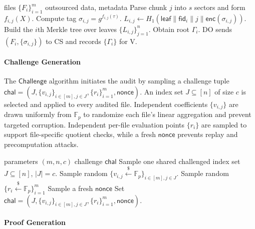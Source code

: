\documentclass[lettersize,journal]{IEEEtran}
\newcommand{\FF}{\mathbb{F}}
\newcommand{\Store}{\mathsf{Store}}
\newcommand{\Chal}{\mathsf{Challenge}}
\begin{document}
\begin{algorithm}[h]
\caption{$\Store$}
\label{alg:store}
\begin{algorithmic}[1]
\Require files $\{F_i\}_{i=1}^m$
\Ensure outsourced data, metadata
    \State Parse chunk $j$ into $s$ sectors and form $f_{i,j}(X)$.
    \State Compute tag $\sigma_{i,j}=g^{f_{i,j}(\tau)}$.
    \State $L_{i,j}\gets H_1(\mathsf{leaf}\|\mathsf{fid}_i\|j\|\mathsf{enc}(\sigma_{i,j}))$.
  \EndFor
  \State Build the $i$th Merkle tree over leaves $\{L_{i,j}\}_{j=1}^n$.
  \State Obtain root $\Gamma_i$.
\EndFor
\State DO sends $(F_i,\{\sigma_{i,j}\})$ to CS and records $\{\Gamma_i\}$ for V.
\end{algorithmic}
\end{algorithm}

\paragraph{\textbf{Challenge Generation}}
The $\Chal$ algorithm initiates the audit by sampling a challenge tuple $\mathsf{chal} = (J, \{v_{i,j}\}_{i\in[m],j\in J}, \{r_i\}_{i=1}^m,\mathsf{nonce})$. An index set $J \subseteq [n]$ of size $c$ is selected and applied to every audited file. Independent coefficients $\{v_{i,j}\}$ are drawn uniformly from $\FF_p$ to randomize each file's linear aggregation and prevent targeted corruption. Independent per-file evaluation points $\{r_i\}$ are sampled to support file-specific quotient checks, while a fresh $\mathsf{nonce}$ prevents replay and precomputation attacks.

\begin{algorithm}[h]
\caption{$\Chal$}
\label{alg:chal}
\begin{algorithmic}[1]
\Require parameters $(m,n,c)$
\Ensure challenge $\mathsf{chal}$
\State Sample one shared challenged index set $J\subseteq[n]$, $|J|=c$.
\State Sample random $\{v_{i,j} \xleftarrow{\$}\FF_p\}_{i\in[m],j\in J}$.
\State Sample random $\{r_i \xleftarrow{\$}\FF_p\}_{i=1}^m$
\State Sample a fresh $\mathsf{nonce}$
\State Set
$
\mathsf{chal}=(J,\{v_{i,j}\}_{i\in[m],j\in J}, \{r_i\}_{i=1}^m, \mathsf{nonce}).
$
\end{algorithmic}
\end{algorithm}




\paragraph{\textbf{Proof Generation}}
\end{document}
